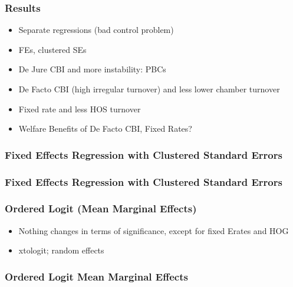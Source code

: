 \documentclass{beamer}
\begin{document}
    \begin{frame}
        \frametitle{Results}
        \begin{itemize}
            \item Separate regressions (bad control problem)
            \item FEs, clustered SEs
            \item De Jure CBI and more instability: PBCs
            \item De Facto CBI (high irregular turnover) and less lower chamber turnover
            \item Fixed rate and less HOS turnover
            \item Welfare Benefits of De Facto CBI, Fixed Rates?
        \end{itemize}
    \end{frame}

    \begin{frame}
        \frametitle{Fixed Effects Regression with Clustered Standard Errors}
        {
            \let\oldcentering\centering
            \renewcommand\centering{\tiny\oldcentering}
            
        }
    \end{frame}

    \begin{frame}
        \frametitle{Fixed Effects Regression with Clustered Standard Errors}
        {
            \let\oldcentering\centering
            \renewcommand\centering{\tiny\oldcentering}
            
        }
    \end{frame}

    \begin{frame}
        \frametitle{Ordered Logit (Mean Marginal Effects)}
        \begin{itemize}
            \item Nothing changes in terms of significance, except for fixed Erates and HOG
            \item xtologit; random effects
        \end{itemize}
    \end{frame}

    \begin{frame}
        \frametitle{Ordered Logit Mean Marginal Effects}
        {
            \let\oldcentering\centering
            \renewcommand\centering{\tiny\oldcentering}
            
        }
    \end{frame}
\end{document}
